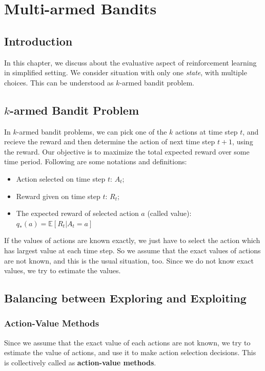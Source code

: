 \documentclass[../../main.tex]{subfiles}
\begin{document}
\chapter{Multi-armed Bandits}

\section{Introduction}
    In this chapter, we discuss about the evaluative aspect of reinforcement learning in simplified setting.
    We consider situation with only one \emph{state}, with multiple choices. This can be understood as $k$-armed bandit problem.
\section{$k$-armed Bandit Problem}
    In $k$-armed bandit problems, we can pick one of the $k$ actions at time step $t$, and recieve the reward and then determine the action of next time step $t+1$,
    using the reward. Our objective is to maximize the total expected reward over some time period. Following are some notations and definitions:

    \begin{itemize}
        \item Action selected on time step $t$: $A_t$;
        \item Reward given on time step $t$: $R_t$;
        \item The expected reward of selected action $a$ (called value): $q_*(a) = \mathbb{E}[R_t | A_t=a]$
    \end{itemize}

    If the values of actions are known exactly, we just have to select the action which has largest value at each time step.
    So we assume that the exact values of actions are not known, and this is the usual situation, too. Since we do not know exact values, we try to estimate the values.

\section{Balancing between Exploring and Exploiting}
    \subsection{Action-Value Methods}
        Since we assume that the exact value of each actions are not known, we try to estimate the value of actions, and use it to make action selection decisions. This is collectively
        called as \textbf{action-value methods}.
\end{document}
